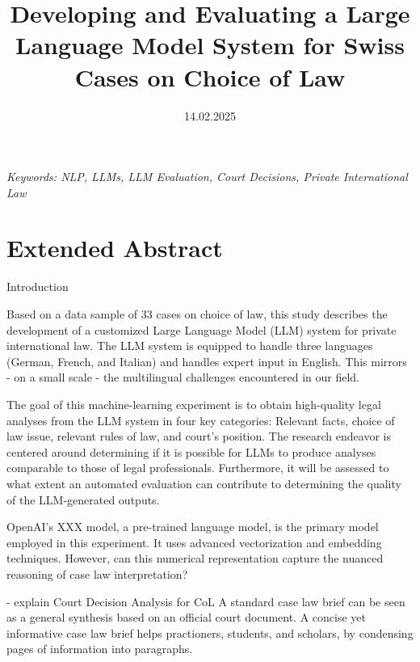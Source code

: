 \documentclass[a4paper,12pt]{article}
\title{Developing and Evaluating a Large Language Model System for Swiss Cases on Choice of Law}
\date{14.02.2025}
\begin{document}
\maketitle
\thispagestyle{fancy}

\begin{center}
\textit{Keywords: NLP, LLMs, LLM Evaluation, Court Decisions, Private International Law}
\newline
\end{center}

\section*{Extended Abstract}

Introduction

Based on a data sample of 33 cases on choice of law, this study describes the development of a customized Large Language Model (LLM) system for private international law. The LLM system is equipped to handle three languages (German, French, and Italian) and handles expert input in English. This mirrors - on a small scale - the multilingual challenges encountered in our field.

The goal of this machine-learning experiment is to obtain high-quality legal analyses from the LLM system in four key categories: Relevant facts, choice of law issue, relevant rules of law, and court's position. The research endeavor is centered around determining if it is possible for LLMs to produce analyses comparable to those of legal professionals. Furthermore, it will be assessed to what extent an automated evaluation can contribute to determining the quality of the LLM-generated outputs.

OpenAI's XXX model, a pre-trained language model, is the primary model employed in this experiment. It uses advanced vectorization and embedding techniques. However, can this numerical representation capture the nuanced reasoning of case law interpretation?

- explain Court Decision Analysis for CoL
A standard case law brief can be seen as a general synthesis based on an official court document. A concise yet informative case law brief helps practioners, students, and scholars, by condensing pages of information into paragraphs. 
\end{document}
